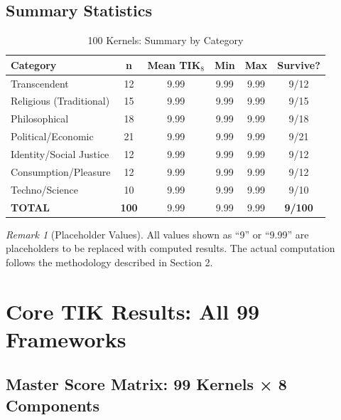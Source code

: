 \documentclass[11pt,a4paper]{article}
\theoremstyle{definition}
\theoremstyle{remark}
\newtheorem{remark}{Remark}
\begin{document}
\subsection{Summary Statistics}

\begin{table}[H]
\centering
\caption{100 Kernels: Summary by Category}
\label{tab:kernel-stats}
\begin{tabular}{@{}lccccc@{}}
\toprule
\textbf{Category} & \textbf{n} & \textbf{Mean TIK$_8$} & \textbf{Min} & \textbf{Max} & \textbf{Survive?} \\
\midrule
Transcendent & 12 & 9.99 & 9.99 & 9.99 & 9/12 \\
Religious (Traditional) & 15 & 9.99 & 9.99 & 9.99 & 9/15 \\
Philosophical & 18 & 9.99 & 9.99 & 9.99 & 9/18 \\
Political/Economic & 21 & 9.99 & 9.99 & 9.99 & 9/21 \\
Identity/Social Justice & 12 & 9.99 & 9.99 & 9.99 & 9/12 \\
Consumption/Pleasure & 12 & 9.99 & 9.99 & 9.99 & 9/12 \\
Techno/Science & 10 & 9.99 & 9.99 & 9.99 & 9/10 \\
\midrule
\textbf{TOTAL} & \textbf{100} & 9.99 & 9.99 & 9.99 & \textbf{9/100} \\
\bottomrule
\end{tabular}
\end{table}

\begin{remark}[Placeholder Values]
All values shown as ``9'' or ``9.99'' are placeholders to be replaced with computed results. The actual computation follows the methodology described in Section 2.
\end{remark}

\newpage

\section{Core TIK Results: All 99 Frameworks}

\subsection{Master Score Matrix: 99 Kernels × 8 Components}
\end{document}
